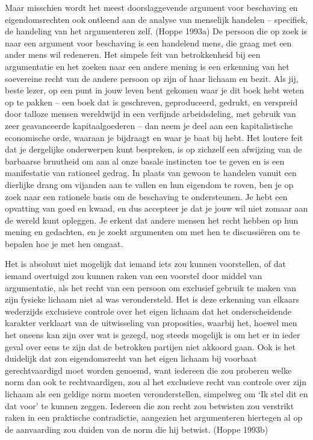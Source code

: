 \documentclass[
  a5paper,
  smalldemyvopaper,11pt,twoside,onecolumn,openright,extrafontsizes,
hidelinks]{memoir}
\begin{document}
Maar misschien wordt het meest doorslaggevende argument voor beschaving
en eigendomsrechten ook ontleend aan de analyse van menselijk handelen
-- specifiek, de handeling van het argumenteren zelf. (Hoppe 1993a) De
persoon die op zoek is naar een argument voor beschaving is een
handelend mens, die graag met een ander mens wil redeneren. Het simpele
feit van betrokkenheid bij een argumentatie en het zoeken naar een
andere mening is een erkenning van het soevereine recht van de andere
persoon op zijn of haar lichaam en bezit. Als jij, beste lezer, op een
punt in jouw leven bent gekomen waar je dit boek hebt weten op te pakken
-- een boek dat is geschreven, geproduceerd, gedrukt, en verspreid door
talloze mensen wereldwijd in een verfijnde arbeidsdeling, met gebruik
van zeer geavanceerde kapitaalgoederen -- dan neem je deel aan een
kapitalistische economische orde, waaraan je bijdraagt en waar je baat
bij hebt. Het loutere feit dat je dergelijke onderwerpen kunt bespreken,
is op zichzelf een afwijzing van de barbaarse bruutheid om aan al onze
basale instincten toe te geven en is een manifestatie van rationeel
gedrag. In plaats van gewoon te handelen vanuit een dierlijke drang om
vijanden aan te vallen en hun eigendom te roven, ben je op zoek naar een
rationele basis om de beschaving te ondersteunen. Je hebt een opvatting
van goed en kwaad, en dus accepteer je dat je jouw wil niet zomaar aan
de wereld kunt opleggen. Je erkent dat andere mensen het recht hebben op
hun mening en gedachten, en je zoekt argumenten om met hen te
discussiëren om te bepalen hoe je met hen omgaat.

Het is absoluut niet mogelijk dat iemand iets zou kunnen voorstellen, of
dat iemand overtuigd zou kunnen raken van een voorstel door middel van
argumentatie, als het recht van een persoon om exclusief gebruik te
maken van zijn fysieke lichaam niet al was verondersteld. Het is deze
erkenning van elkaars wederzijds exclusieve controle over het eigen
lichaam dat het onderscheidende karakter verklaart van de uitwisseling
van proposities, waarbij het, hoewel men het oneens kan zijn over wat is
gezegd, nog steeds mogelijk is om het er in ieder geval over eens te
zijn dat de betrokken partijen niet akkoord gaan. Ook is het duidelijk
dat zon eigendomsrecht van het eigen lichaam bij voorbaat
gerechtvaardigd moet worden genoemd, want iedereen die zou proberen
welke norm dan ook te rechtvaardigen, zou al het exclusieve recht van
controle over zijn lichaam als een geldige norm moeten veronderstellen,
simpelweg om `Ik stel dit en dat voor' te kunnen zeggen. Iedereen die
zon recht zou betwisten zou verstrikt raken in een praktische
contradictie, aangezien het argumenteren hiertegen al op de aanvaarding
zou duiden van de norm die hij betwist. (Hoppe 1993b)
\end{document}
